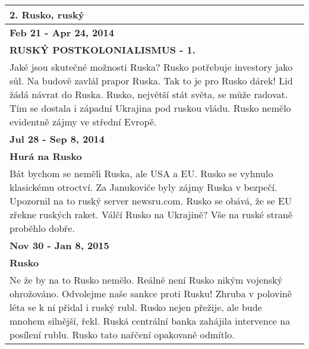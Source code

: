 \begin{tabularx}{\linewidth}{p{\linewidth}} \toprule[1.5pt]
\bf 2. Rusko, ruský \\ \midrule
\bf Feb 21 - Apr 24, 2014 \\ \midrule
\bf RUSKÝ POSTKOLONIALISMUS - 1. \\
Jaké jsou skutečné možnosti Ruska? Rusko potřebuje investory jako sůl. Na budově zavlál prapor Ruska. Tak to je pro Rusko dárek! Lid žádá návrat do Ruska. Rusko, největší stát světa, se může radovat. Tím se dostala i západní Ukrajina pod ruskou vládu. Rusko nemělo evidentně zájmy ve střední Evropě. \\ \bottomrule[1.25pt]

\bf Jul 28 - Sep 8, 2014 \\ \midrule
\bf Hurá na Rusko \\
Bát bychom se neměli Ruska, ale USA a EU. Rusko se vyhnulo klasickému otroctví. Za Janukoviče byly zájmy Ruska v bezpečí. Upozornil na to ruský server newsru.com. Rusko se obává, že se EU zřekne ruských raket. Válčí Rusko na Ukrajině? Vše na ruské straně proběhlo dobře. \\ \bottomrule[1.25pt]

\bf Nov 30 - Jan 8, 2015 \\ \midrule
\bf Rusko \\
Ne že by na to Rusko nemělo. Reálně není Rusko nikým vojenský ohrožováno. Odvolejme naše sankce proti Rusku! Zhruba v polovině léta se k ní přidal i ruský rubl. Rusko nejen přežije, ale bude mnohem silnější, řekl. Ruská centrální banka zahájila intervence na posílení rublu. Rusko tato nařčení opakovaně odmítlo. \\ \bottomrule[1.25pt]
\end{tabularx}


\hspace{\fill}